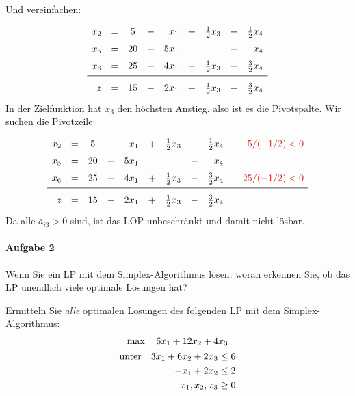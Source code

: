 \documentclass[
a4paper, %
11pt,
]
{scrartcl}
\begin{document}
Und vereinfachen:
\begin{align*}
  \def\arraystretch{1.5}
  \begin{array}{rcccrcrcr}
    x_2 & = & 5  & - & x_1   & + & \frac{1}{2} x_3 & - & \frac{1}{2} x_4\\
    x_5 & = & 20 & - & 5 x_1 &   &                 & - & x_4\\
    x_6 & = & 25 & - & 4 x_1 & + & \frac{1}{2} x_3 & - & \frac{3}{2} x_4\\\midrule
    z   & = & 15 & - & 2 x_1 & + & \frac{1}{2} x_3 & - & \frac{3}{2} x_4
  \end{array}
\end{align*}
In der Zielfunktion hat $x_3$ den höchsten Anstieg, also ist es die Pivotspalte.
Wir suchen die Pivotzeile:
\begin{align*}
  \def\arraystretch{1.5}
  \begin{array}{rcccrcrcrcr}
    x_2 & = & 5  & - & x_1   & + & \frac{1}{2} x_3 & - & \frac{1}{2} x_4 & & \rot{5/(-1/2) < 0}\\
    x_5 & = & 20 & - & 5 x_1 &   &                 & - & x_4\\
    x_6 & = & 25 & - & 4 x_1 & + & \frac{1}{2} x_3 & - & \frac{3}{2} x_4 & & \rot{25/(-1/2) < 0}\\
    \midrule
    z   & = & 15 & - & 2 x_1 & + & \frac{1}{2} x_3 & - & \frac{3}{2} x_4
  \end{array}
\end{align*}
Da alle $\bar{a}_{i3} > 0$ sind, ist das LOP unbeschränkt und damit nicht
lösbar.

\paragraph{Aufgabe 2}%
\label{par:aufgabe_2}
Wenn Sie ein LP mit dem Simplex-Algorithmus lösen: woran erkennen Sie, ob das LP
unendlich viele optimale Lösungen hat?

Ermitteln Sie \textit{alle} optimalen Lösungen des folgenden LP mit dem
Simplex-Algorithmus:
\begin{gather*}
  \max \quad 6x_1 + 12x_2 + 4x_3\\
  \begin{aligned}
    \textup{unter}
    \quad
    3x_1 + 6x_2 + 2x_3 & \leq 6\\
    -x_1 + 2x_2        & \leq 2\\
    x_1, x_2, x_3      & \geq 0
  \end{aligned}
\end{gather*}
\end{document}
